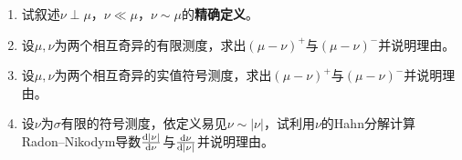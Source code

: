 \begin{enumerate}
    \begin{enumerate}[label=(\arabic*)]
        \item 试叙述$\nu\perp\mu$，$\nu\ll\mu$，$\nu\sim\mu$的\textbf{精确定义}。
        \item 设$\mu,\nu$为两个相互奇异的有限测度，求出$(\mu-\nu)^+$与$(\mu-\nu)^-$并说明理由。
        \item 设$\mu,\nu$为两个相互奇异的实值符号测度，求出$(\mu-\nu)^+$与$(\mu-\nu)^-$并说明理由。
        \item 设$\nu$为$\sigma$有限的符号测度，依定义易见$\nu\sim|\nu|$，试利用$\nu$的Hahn分解计算
        Radon--Nikodym导数$\frac{{\rm d}|\nu|}{{\rm d}\nu}$与$\frac{{\rm d}\nu}{{\rm d}|\nu|}$并说明理由。
    \end{enumerate}
\end{enumerate}